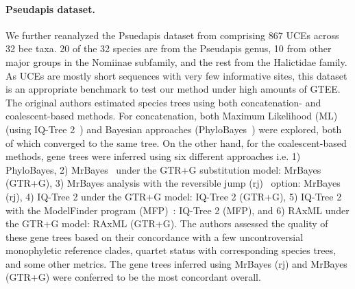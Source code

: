 \documentclass[10pt,a4paper]{article}
\begin{document}
\paragraph{Pseudapis dataset.}
We further reanalyzed the Psuedapis dataset from \cite{bossert2021gene} comprising 867 UCEs across 32 bee taxa. 20 of the 32 species are from the Pseudapis genus, 10 from other major groups in the Nomiinae subfamily, and the rest from the Halictidae family. As UCEs are mostly short sequences with very few informative sites, this dataset is an appropriate benchmark to test our method under high amounts of GTEE. The original authors estimated species trees using both concatenation- and coalescent-based methods.
For concatenation, both Maximum Likelihood (ML) (using IQ-Tree 2~\cite{minh2020iq}) and Bayesian approaches (PhyloBayes~\cite{lartillot2009phylobayes}) were explored, both of which converged to the same tree. On the other hand, for the coalescent-based methods, gene trees were inferred using six different approaches i.e. 1) PhyloBayes, 2) MrBayes~\cite{ronquist2012mrbayes} under the GTR+G substitution model: MrBayes (GTR+G), 3) MrBayes analysis with the reversible jump (rj)~\cite{huelsenbeck2004bayesian} option: MrBayes (rj), 4) IQ-Tree 2 under the GTR+G model: IQ-Tree 2 (GTR+G), 5) IQ-Tree 2 with the ModelFinder program (MFP)~\cite{kalyaanamoorthy2017modelfinder}: IQ-Tree 2 (MFP), and 6) RAxML under the GTR+G model: RAxML (GTR+G). The authors assessed the quality of these gene trees based on their concordance with a few uncontroversial monophyletic reference clades, quartet status with corresponding species trees, and some other metrics. The gene trees inferred using MrBayes (rj) and MrBayes (GTR+G) were conferred to be the most concordant overall.
\end{document}
